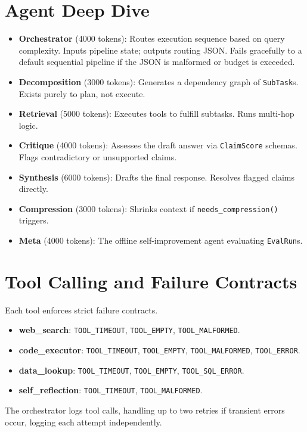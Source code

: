 \documentclass[11pt]{article}
\begin{document}
\section{Agent Deep Dive}
\begin{itemize}
    \item \textbf{Orchestrator} (4000 tokens): Routes execution sequence based on query complexity. Inputs pipeline state; outputs routing JSON. Fails gracefully to a default sequential pipeline if the JSON is malformed or budget is exceeded.
    \item \textbf{Decomposition} (3000 tokens): Generates a dependency graph of \texttt{SubTask}s. Exists purely to plan, not execute.
    \item \textbf{Retrieval} (5000 tokens): Executes tools to fulfill subtasks. Runs multi-hop logic.
    \item \textbf{Critique} (4000 tokens): Assesses the draft answer via \texttt{ClaimScore} schemas. Flags contradictory or unsupported claims. 
    \item \textbf{Synthesis} (6000 tokens): Drafts the final response. Resolves flagged claims directly.
    \item \textbf{Compression} (3000 tokens): Shrinks context if \texttt{needs\_compression()} triggers.
    \item \textbf{Meta} (4000 tokens): The offline self-improvement agent evaluating \texttt{EvalRun}s.
\end{itemize}

\section{Tool Calling and Failure Contracts}
Each tool enforces strict failure contracts.
\begin{itemize}
    \item \textbf{web\_search}: \texttt{TOOL\_TIMEOUT}, \texttt{TOOL\_EMPTY}, \texttt{TOOL\_MALFORMED}.
    \item \textbf{code\_executor}: \texttt{TOOL\_TIMEOUT}, \texttt{TOOL\_EMPTY}, \texttt{TOOL\_MALFORMED}, \texttt{TOOL\_ERROR}.
    \item \textbf{data\_lookup}: \texttt{TOOL\_TIMEOUT}, \texttt{TOOL\_EMPTY}, \texttt{TOOL\_SQL\_ERROR}.
    \item \textbf{self\_reflection}: \texttt{TOOL\_TIMEOUT}, \texttt{TOOL\_MALFORMED}.
\end{itemize}
The orchestrator logs tool calls, handling up to two retries if transient errors occur, logging each attempt independently.
\end{document}
